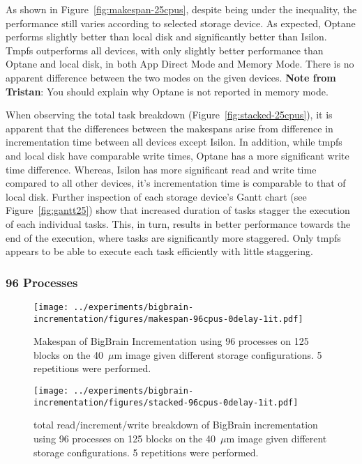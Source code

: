 \documentclass[conference]{IEEEtran}
\newcommand{\bigbrain}{BigBrain }
\newcommand{\tristan}[1]{\color{orange}\textbf{Note from Tristan}:
      #1 \color{black}}
\begin{document}
As shown in Figure~\ref{fig:makespan-25cpus}, despite being under the inequality, the
performance still varies according to selected storage device. As expected, Optane performs
slightly better than local disk and significantly better than Isilon. Tmpfs outperforms all
devices, with only slightly better performance than Optane and local disk, in both App Direct Mode and Memory Mode.
There is no apparent difference between the two modes on the given devices.
\tristan{You should explain why Optane is not reported in memory mode.}

When observing the total task breakdown (Figure~\ref{fig:stacked-25cpus}), it is
apparent that the differences between the makespans arise from difference in incrementation
time between all devices except Isilon. In addition, while tmpfs and local disk have comparable write times, Optane
has a more significant write time difference. Whereas, Isilon has more significant read and
write time compared to all other devices, it's incrementation time is comparable to that
of local disk. Further inspection of each storage device's Gantt chart (see Figure~\ref{fig:gantt25})
show that increased duration of tasks stagger the execution of each individual tasks. This, in turn,
results in better performance towards the end of the execution, where tasks are significantly more staggered.
Only tmpfs appears to be able to execute each task efficiently with little staggering.
\subsubsection{96 Processes}
\begin{figure}
    \texttt{[image: ../experiments/bigbrain-incrementation/figures/makespan-96cpus-0delay-1it.pdf]}
    \captionsetup{width=\columnwidth}
    \caption{Makespan of \bigbrain Incrementation using 96 processes on 125 blocks on the 40~$\mu$m image given different storage configurations. 5 repetitions were performed.}\label{fig:makespan-96cpus}
\end{figure}
\begin{figure}
    \texttt{[image: ../experiments/bigbrain-incrementation/figures/stacked-96cpus-0delay-1it.pdf]}
    \captionsetup{width=\columnwidth}
    \caption{total read/increment/write breakdown of \bigbrain incrementation using 96 processes on 125 blocks on the 40~$\mu$m image given different storage configurations. 5 repetitions were performed.}\label{fig:stacked-96cpus}
\end{figure}
\end{document}
